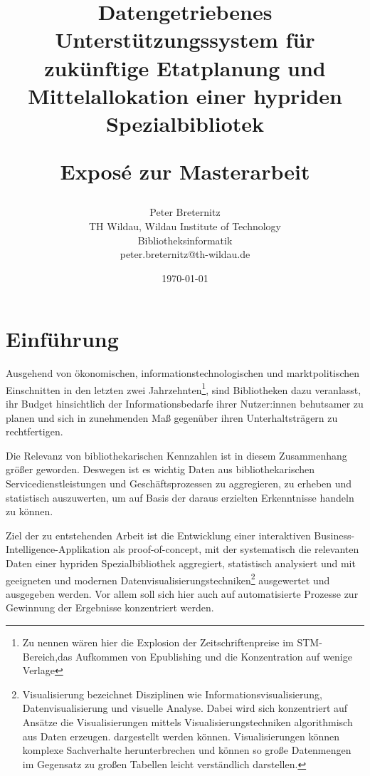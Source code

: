\documentclass[10pt,a4paper,twocolumn,conference]{IEEEtran}
\begin{document}
\title{{\bf Datengetriebenes Unterstützungssystem für zukünftige
        Etatplanung und Mittelallokation einer hypriden
        Spezialbibliotek} \\ 
    \begin{large}
        Exposé zur Masterarbeit                                                                             
    \end{large}}
\author{
	Peter Breternitz \\
	TH Wildau, Wildau Institute of Technology\\ Bibliotheksinformatik \\
	peter.breternitz@th-wildau.de
}


\date{\today}

\maketitle

\section{Einführung}
Ausgehend von ökonomischen, informationstechnologischen und marktpolitischen Einschnitten in den
letzten zwei Jahrzehnten\footnote{Zu nennen wären hier die Explosion der Zeitschriftenpreise im 
STM-Bereich,das Aufkommen von Epublishing und die Konzentration auf wenige
Verlage},
sind Bibliotheken dazu veranlasst, ihr Budget hinsichtlich der Informationsbedarfe
ihrer Nutzer:innen behutsamer zu planen und sich in zunehmenden Maß gegenüber ihren Unterhaltsträgern zu rechtfertigen.

Die Relevanz von bibliothekarischen Kennzahlen ist in diesem Zusammenhang größer geworden. 
Deswegen ist es wichtig Daten aus bibliothekarischen Servicedienstleistungen
und Geschäftsprozessen zu aggregieren, zu erheben und statistisch
auszuwerten, um auf Basis der daraus erzielten Erkenntnisse handeln zu können.

Ziel der zu entstehenden Arbeit ist die Entwicklung einer
interaktiven Business-Intelligence-Applikation als proof-of-concept,
mit der systematisch die relevanten Daten einer hypriden Spezialbibliothek aggregiert, statistisch
analysiert und mit geeigneten und modernen Datenvisualisierungstechniken\footnote{Visualisierung bezeichnet Disziplinen
wie Informationsvisualisierung, Datenvisualisierung und visuelle Analyse. Dabei wird sich konzentriert 
auf Ansätze die Visualisierungen mittels Visualisierungstechniken algorithmisch aus 
Daten erzeugen. dargestellt werden können. 
Visualisierungen können komplexe Sachverhalte herunterbrechen und können
so große Datenmengen im Gegensatz zu großen Tabellen leicht verständlich
darstellen.\cite{RN100}} ausgewertet und ausgegeben werden.
Vor allem soll sich hier auch auf automatisierte Prozesse zur Gewinnung der Ergebnisse konzentriert werden.
\end{document}
